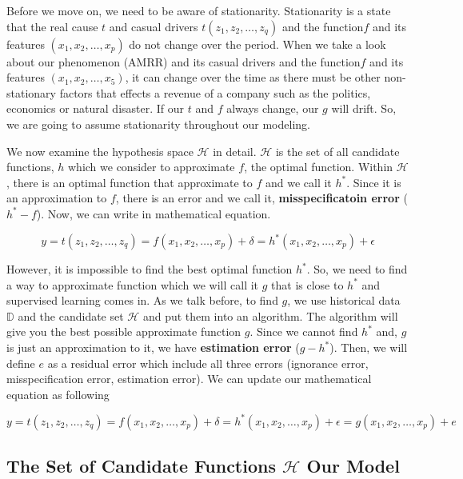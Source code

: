\documentclass[12pt]{article}
\begin{document}
Before we move on, we need to be aware of stationarity. Stationarity is a state that the real cause $t$ and casual drivers $t(z_1, z_2, \dots, z_q)$ and the function$f$ and its features $(x_1, x_2, \dots, x_p)$ do not change over the period. When we take a look about our phenomenon (AMRR) and its casual drivers and the function$f$ and its features $(x_1, x_2, \dots, x_5)$, it can change over the time as there must be other non-stationary factors that effects a revenue of a company such as the politics, economics or natural disaster. If our $t$ and $f$ always change, our $g$ will drift. So, we are going to assume stationarity throughout our modeling. 

We now examine the hypothesis space $\mathcal{H}$ in detail. $\mathcal{H}$ is the set of all candidate functions, $h$ which we consider to approximate $f$, the optimal function. Within $\mathcal{H}$, there is an optimal function that approximate to $f$ and we call it $h^*$. Since it is an approximation to $f$, there is an error and we call it, \textbf{misspecificatoin error} ($h^* - f$). Now, we can write in mathematical equation.

\[
y = t(z_1, z_2, \dots, z_q) = f(x_1, x_2, \dots, x_p) + \delta = h^*(x_1, x_2, \dots, x_p) + \epsilon
\]

However, it is impossible to find the best optimal function $h^*$. So, we need to find a way to approximate function which we will call it $g$ that is close to $h^*$ and supervised learning comes in. As we talk before, to find $g$, we use historical data $\mathbb{D}$ and the candidate set $\mathcal{H}$ and put them into an algorithm. The algorithm will give you the best possible approximate function $g$. Since we cannot find $h^*$ and, $g$ is just an approximation to it, we have \textbf{estimation error} ($g-h^*$). Then, we will define $e$ as a residual error which include all three errors (ignorance error, misspecification error, estimation error). We can update our mathematical equation as following

\[
y = t(z_1, z_2, \dots, z_q) = f(x_1, x_2, \dots, x_p) + \delta = h^*(x_1, x_2, \dots, x_p) + \epsilon = g(x_1, x_2, \dots, x_p) + e
\]

\subsection{The Set of Candidate Functions $\mathcal{H}$ Our Model} 
\end{document}
